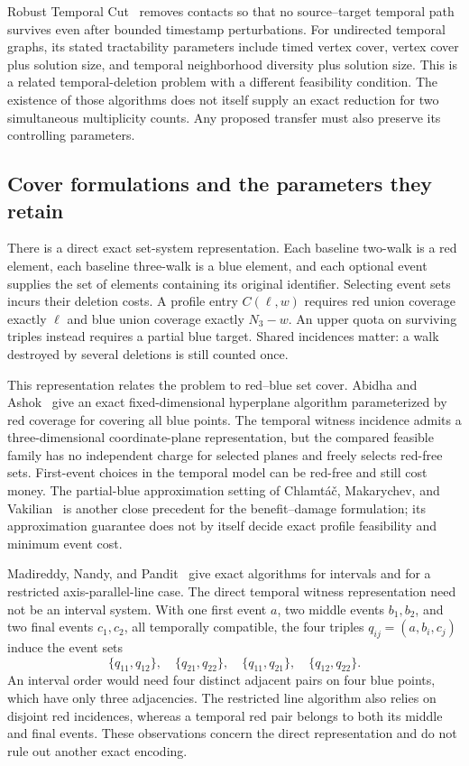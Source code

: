 Robust Temporal Cut~\citep{enright2026robust} removes contacts so that no
source--target temporal path survives even after bounded timestamp
perturbations. For undirected temporal graphs, its stated tractability
parameters include timed vertex
cover, vertex cover plus solution size, and temporal neighborhood diversity
plus solution size. This is a related temporal-deletion problem with a
different feasibility condition. The existence of those algorithms does not
itself supply an exact reduction for two simultaneous multiplicity counts.
Any proposed transfer must also preserve its controlling parameters.

\subsection{Cover formulations and the parameters they retain}

There is a direct exact set-system representation. Each baseline two-walk is
a red element, each baseline three-walk is a blue element, and each optional
event supplies the set of elements containing its original identifier.
Selecting event sets incurs their deletion costs. A profile entry
$C(\ell,w)$ requires red union coverage exactly $\ell$ and blue union
coverage exactly $N_3-w$. An upper quota on surviving triples instead
requires a partial blue target. Shared incidences matter: a walk destroyed
by several deletions is still counted once.

This representation relates the problem to red--blue set cover. Abidha and
Ashok~\citep[Theorem 6 in the author preprint]{abidha2024} give an exact
fixed-dimensional hyperplane algorithm parameterized by red coverage for
covering all blue points. The temporal witness incidence admits a
three-dimensional coordinate-plane representation, but the compared
feasible family has no independent charge for selected planes and freely
selects red-free sets. First-event choices in the temporal model can be red-free and still
cost money. The partial-blue approximation setting of
Chlamt\'a\v{c}, Makarychev, and Vakilian~\citep[Appendix A]{chlamtac2023}
is another close precedent for the benefit--damage formulation; its
approximation guarantee does not by itself decide exact profile feasibility
and minimum event cost.

Madireddy, Nandy, and Pandit~\citep[Theorems 1--2]{madireddy2025} give exact
algorithms for intervals and for a restricted axis-parallel-line case. The
direct temporal witness representation need not be an interval system.
With one first event $a$, two middle events $b_1,b_2$, and two final events
$c_1,c_2$, all temporally compatible, the four triples $q_{ij}=(a,b_i,c_j)$
induce the event sets
\[
 \{q_{11},q_{12}\},\quad \{q_{21},q_{22}\},\quad
 \{q_{11},q_{21}\},\quad \{q_{12},q_{22}\}.
\]
An interval order would need four distinct adjacent pairs on four blue
points, which have only three adjacencies. The restricted line algorithm
also relies on disjoint red incidences, whereas a temporal red pair belongs
to both its middle and final events. These observations concern the direct
representation and do not rule out another exact encoding.

